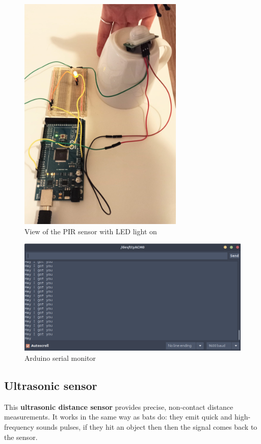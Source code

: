 \begin{figure}[H]
    \centering
    \includegraphics[width=0.7\textwidth]{fig/pir-on.jpeg}
    \caption{View of the PIR sensor with LED light on}
    \label{fig:pir-on}
\end{figure}

\begin{figure}[H]
    \centering
    \includegraphics[width=1\textwidth]{fig/pir-got-you.png}
    \caption{Arduino serial monitor}
    \label{fig:pir-got-you}
\end{figure}

\newpage
\subsection{Ultrasonic sensor}
This \textbf{ultrasonic distance sensor} provides precise, non-contact distance measurements. It works in the same way as bats do: they emit quick and high-frequency sounds pulses, if they hit an object then then the signal comes back to the sensor.

